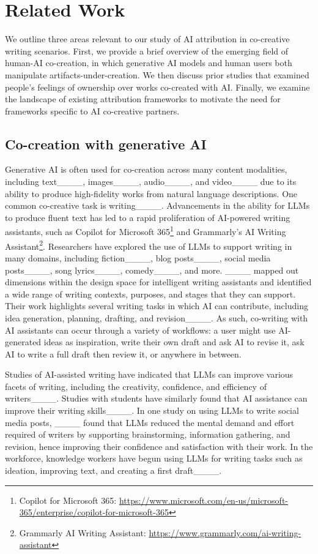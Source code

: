 \section{Related Work}
We outline three areas relevant to our study of AI attribution in co-creative writing scenarios. First, we provide a brief overview of the emerging field of human-AI co-creation, in which generative AI models and human users both manipulate artifacts-under-creation. We then discuss prior studies that examined people's feelings of ownership over works co-created with AI. Finally, we examine the landscape of existing attribution frameworks to motivate the need for frameworks specific to AI co-creative partners.

\subsection{Co-creation with generative AI}

Generative AI is often used for co-creation across many content modalities, including text____, images____, audio____, and video____ due to its ability to produce high-fidelity works from natural language descriptions. One common co-creative task is writing____. Advancements in the ability for LLMs to produce fluent text has led to a rapid proliferation of AI-powered writing assistants, such as Copilot for Microsoft 365\footnote{Copilot for Microsoft 365: \url{https://www.microsoft.com/en-us/microsoft-365/enterprise/copilot-for-microsoft-365}} and Grammarly's AI Writing Assistant\footnote{Grammarly AI Writing Assistant: \url{https://www.grammarly.com/ai-writing-assistant}}. Researchers have explored the use of LLMs to support writing in many domains, including fiction____, blog posts____, social media posts____, song lyrics____, comedy____, and more. ____ mapped out dimensions within the design space for intelligent writing assistants and identified a wide range of writing contexts, purposes, and stages that they can support. Their work highlights several writing tasks in which AI can contribute, including idea generation, planning, drafting, and revision____. As such, co-writing with AI assistants can occur through a variety of workflows: a user might use AI-generated ideas as inspiration, write their own draft and ask AI to revise it, ask AI to write a full draft then review it, or anywhere in between. 

Studies of AI-assisted writing have indicated that LLMs can improve various facets of writing, including the creativity, confidence, and efficiency of writers____. Studies with students have similarly found that AI assistance can improve their writing skills____. In one study on using LLMs to write social media posts, ____ found that LLMs reduced the mental demand and effort required of writers by supporting brainstorming, information gathering, and revision, hence improving their confidence and satisfaction with their work. In the workforce, knowledge workers have begun using LLMs for writing tasks such as ideation, improving text, and creating a first draft____.

